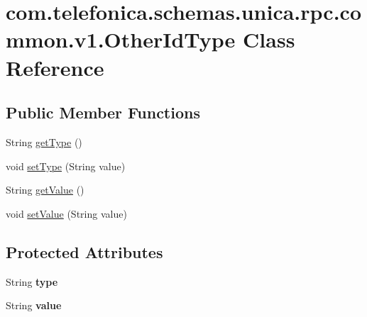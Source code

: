 \hypertarget{classcom_1_1telefonica_1_1schemas_1_1unica_1_1rpc_1_1common_1_1v1_1_1OtherIdType}{
\section{com.telefonica.schemas.unica.rpc.common.v1.OtherIdType Class Reference}
\label{classcom_1_1telefonica_1_1schemas_1_1unica_1_1rpc_1_1common_1_1v1_1_1OtherIdType}
}
\subsection*{Public Member Functions}
\begin{DoxyCompactItemize}
\item 
String \hyperlink{classcom_1_1telefonica_1_1schemas_1_1unica_1_1rpc_1_1common_1_1v1_1_1OtherIdType_a5e81776c2bf4c13dd986e7dd1cbcd41c}{getType} ()
\item 
void \hyperlink{classcom_1_1telefonica_1_1schemas_1_1unica_1_1rpc_1_1common_1_1v1_1_1OtherIdType_a6f5488d5038c0ddffe0d7d74574c3a53}{setType} (String value)
\item 
String \hyperlink{classcom_1_1telefonica_1_1schemas_1_1unica_1_1rpc_1_1common_1_1v1_1_1OtherIdType_a09d7ff8689f05546fbcf284585639828}{getValue} ()
\item 
void \hyperlink{classcom_1_1telefonica_1_1schemas_1_1unica_1_1rpc_1_1common_1_1v1_1_1OtherIdType_aa6313e215349bf19d7d086e8a54270dd}{setValue} (String value)
\end{DoxyCompactItemize}
\subsection*{Protected Attributes}
\begin{DoxyCompactItemize}
\item 
\hypertarget{classcom_1_1telefonica_1_1schemas_1_1unica_1_1rpc_1_1common_1_1v1_1_1OtherIdType_a212e810547814fb70d8af5a79e5ead2b}{
String {\bfseries type}}
\label{classcom_1_1telefonica_1_1schemas_1_1unica_1_1rpc_1_1common_1_1v1_1_1OtherIdType_a212e810547814fb70d8af5a79e5ead2b}

\item 
\hypertarget{classcom_1_1telefonica_1_1schemas_1_1unica_1_1rpc_1_1common_1_1v1_1_1OtherIdType_a647ca7b96861211d6b26a143782976b9}{
String {\bfseries value}}
\label{classcom_1_1telefonica_1_1schemas_1_1unica_1_1rpc_1_1common_1_1v1_1_1OtherIdType_a647ca7b96861211d6b26a143782976b9}

\end{DoxyCompactItemize}


